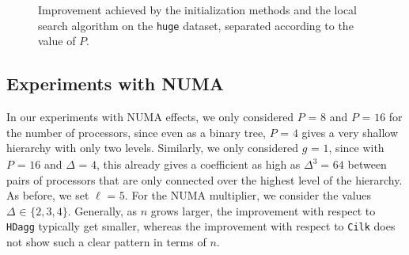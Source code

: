 \documentclass[sigconf,nonacm]{acmart}
\begin{document}
\begin{figure*}[ht]
\begin{minipage}[b]{0.25\textwidth}
  \end{minipage}
  \hspace{0.07\textwidth}
    \begin{minipage}[b]{0.25\textwidth}
  \end{minipage}
  \hfill
  \caption{Improvement achieved by the initialization methods and the local search algorithm on the \texttt{huge} dataset, separated according to the value of $P$.}
  \label{fig:huge}
\end{figure*}

\subsection{Experiments with NUMA}

In our experiments with NUMA effects, we only considered $P_{\!}=_{\!}8$ and $P_{\!}=_{\!}16$ for the number of processors, since even as a binary tree, $P_{\!}=_{\!}4$ gives a very shallow hierarchy with only two levels. Similarly, we only considered $g_{\!}=_{\!}1$, since with $P_{\!}=_{\!}16$ and $\Delta_{\!}=_{\!}4$, this already gives a coefficient as high as $\Delta^3_{\!}=_{\!}64$ between pairs of processors that are only connected over the highest level of the hierarchy. As before, we set $\ell_{\!}=_{\!}5$. For the NUMA multiplier, we consider the values $\Delta _{\!} \in _{\!} \{ 2, 3, 4\}$. Generally, as $n$ grows larger, the improvement with respect to \texttt{HDagg} typically get smaller, whereas the improvement with respect to \texttt{Cilk} does not show such a clear pattern in terms of $n$.
\end{document}
